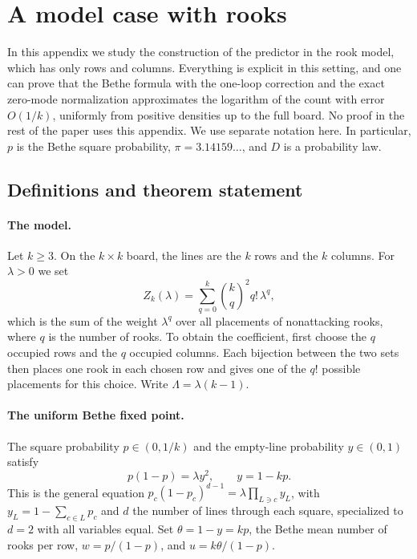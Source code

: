 \appendix
\section{A model case with rooks}\label{sec:torres}

In this appendix we study the construction of the predictor in the rook model, which has only
rows and columns. Everything is explicit in this setting, and one can prove that the Bethe formula
with the one-loop correction and the exact zero-mode normalization approximates the logarithm of the count
with error $O(1/k)$,
uniformly from positive densities up to the full board. No proof in the rest of the paper
uses this appendix. We use separate notation here. In particular, $p$ is the Bethe square probability,
$\pi=3.14159\ldots$, and $D$ is a probability law.

\subsection{Definitions and theorem statement}

\paragraph{The model.}
Let $k\ge3$. On the $k\times k$ board, the lines are the $k$ rows and the $k$ columns. For
$\lambda>0$ we set
\[
 Z_k(\lambda)=\sum_{q=0}^{k}\binom kq^2q!\,\lambda^q,
\]
which is the sum of the weight $\lambda^q$ over all placements of nonattacking rooks, where $q$
is the number of rooks. To obtain
the coefficient, first choose the $q$ occupied rows and the $q$ occupied columns. Each
bijection between the two sets then places one rook in each chosen row and gives one of the $q!$
possible placements for this choice. Write $\Lambda=\lambda(k-1)$.

\paragraph{The uniform Bethe fixed point.}
The square probability $p\in(0,1/k)$ and the empty-line probability $y\in(0,1)$ satisfy
\begin{equation}\label{eq:torres-punto}
 p(1-p)=\lambda y^2,\qquad y=1-kp.
\end{equation}
This is the general equation $p_c(1-p_c)^{d-1}=\lambda\prod_{L\ni c}y_L$, with $y_L=1-\sum_{c\in L}p_c$
and $d$ the number of lines through each square, specialized to $d=2$ with all variables equal. Set
$\theta=1-y=kp$, the Bethe mean number of rooks per row,
$w=p/(1-p)$, and $u=k\theta/(1-p)$.

